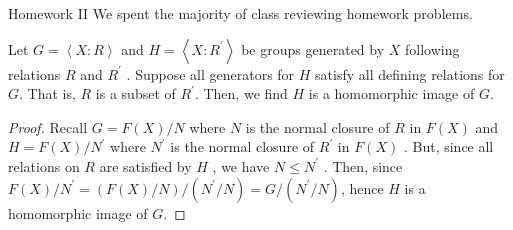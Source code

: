 \begin{note}{Homework II}
We spent the majority of class reviewing homework problems.
\end{note}
\begin{theorem}
	Let \(G = \left<X : R \right> \) and \(H = \left<X : R^{\prime} \right> \)  be groups generated by \(X\) following relations \(R\) and \(R^{\prime}\) . Suppose all generators for \(H\) satisfy all defining relations for \(G\). That is, \(R\) is a subset of \(R^{\prime}\). Then, we find \(H\) is a homomorphic image of \(G\).
\end{theorem}
\begin{proof}
	Recall \(G = F\left( X \right)  / N\)  where \(N\) is the normal closure of \(R\) in \(F\left( X \right) \) and \(H = F\left( X \right)  / N^{\prime}\)  where \(N^{\prime}\)  is the normal closure of \(R^{\prime}\) in \(F\left( X \right) \) . But, since all relations on \(R\) are satisfied by \(H\) , we have \(N \le N^{\prime}\) .  Then, since \(F\left( X \right)  / N^{\prime} = \left( F\left( X \right) / N \right) / \left( N^{\prime} / N \right) = G / \left( N^{\prime} / N \right) \), hence \(H\) is a homomorphic image of \(G\).
\end{proof}
